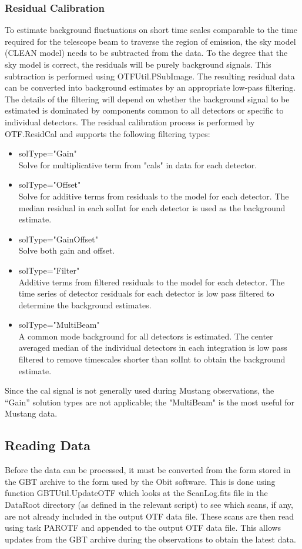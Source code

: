 \documentclass[11pt]{report}
\begin{document}
\subsubsection{Residual Calibration\label{residual_filter}}
To estimate background fluctuations on short time scales comparable to
the time required for the telescope beam to traverse the region of
emission, the sky model (CLEAN model) needs to be subtracted from the
data.
To the degree that the sky model is correct, the residuals will be
purely background signals.
This subtraction is performed using OTFUtil.PSubImage.
The resulting residual data can be converted into background estimates
by an appropriate low-pass filtering.
The details of the filtering will depend on whether the background
signal to be estimated is dominated by components common to all
detectors or specific to individual detectors.
The residual calibration process is performed by OTF.ResidCal and
supports the following filtering types:
\begin{itemize}
\item solType="Gain" \\
Solve for multiplicative term from "cals" in data for each detector.
\item solType="Offset" \\
Solve for additive terms from residuals to the model for each
detector.
The median residual in each solInt for each detector is used as the
background estimate.
\item solType="GainOffset"\\
Solve both gain and offset.
\item solType="Filter"\\
Additive terms from filtered residuals to the model for each
detector.
The time series of detector residuals for each detector is low pass
filtered to determine the background estimates.
\item solType="MultiBeam"\\
A common mode background for all detectors is estimated.
The center averaged median of the individual detectors in each
integration is low pass filtered to remove timescales shorter than
solInt to obtain the background estimate.
\end{itemize}
Since the cal signal is not generally used during Mustang
observations, the ``Gain'' solution types are not applicable; the
"MultiBeam" is the most useful for Mustang data.


\subsection{Reading Data}
Before the data can be processed, it must be converted from the form
stored in the GBT archive to the form used by the Obit software.
This is done using function GBTUtil.UpdateOTF which looks at the
ScanLog.fits file in the DataRoot directory (as defined in the
relevant script) to see which scans, if any, are not already included
in the output OTF data file.
These scans are then read using task PAROTF and appended to the output
OTF data file.
This allows updates from the GBT archive during the observations to
obtain the latest data.
\end{document}
